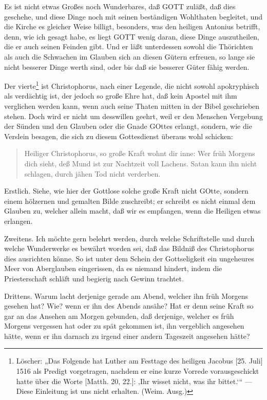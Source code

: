 Es ist nicht etwas Großes noch Wunderbares, daß GOTT zuläßt, daß dies geschehe, und diese Dinge noch mit seinen beständigen Wohlthaten begleitet, und die Kirche es gleicher Weise billigt, besonders, was den heiligen Antonius betrifft, denn, wie ich gesagt habe, es liegt GOTT wenig daran, diese Dinge auszutheilen, die er auch seinen Feinden gibt. Und er läßt unterdessen sowohl die Thörichten als auch die Schwachen im Glauben sich an diesen Gütern erfreuen, so lange sie nicht besserer Dinge werth sind, oder bis daß sie besserer Güter fähig werden.

Der vierte\footnote{Löscher: „Das Folgende hat Luther am Festtage des heiligen Jacobus [25. Juli] 1516 als Predigt vorgetragen, nachdem er eine kurze Vorrede vorausgeschickt hatte über die Worte [Matth. 20, 22.]: ‚Ihr wisset nicht, was ihr bittet.‘“ — Diese Einleitung ist uns nicht erhalten. (Weim. Ausg.)} ist Christophorus, nach einer
Legende, die nicht sowohl apokryphisch als verdächtig ist, der jedoch so große Ehre hat, daß kein Apostel mit ihm verglichen werden kann, wenn auch seine Thaten mitten in der Bibel geschrieben stehen. Doch wird er nicht um desswillen geehrt, weil er den Menschen Vergebung der Sünden und den Glauben oder die Gnade GOttes erlangt, sondern, wie die Verslein besagen, die sich zu diesem Gottesdienst überaus wohl schicken:

\begin{quote}
Heiliger Christophorus, so große Kraft wohnt dir inne: Wer früh Morgens dich sieht, deß Mund ist zur Nachtzeit voll Lachens. Satan kann ihn nicht schlagen, durch jähen Tod nicht verderben.
\end{quote}

Erstlich. Siehe, wie hier der Gottlose solche große Kraft nicht GOtte, sondern einem hölzernen und gemalten Bilde zuschreibt; er schreibt es nicht einmal dem Glauben zu, welcher allein macht, daß wir es empfangen, wenn die Heiligen etwas erlangen.

Zweitens. Ich möchte gern belehrt werden, durch welche Schriftstelle und durch welche Wunderwerke es bewährt worden sei, daß das Bildniß des Christophorus dies ausrichten könne. So ist unter dem Schein der Gottseligkeit ein ungeheures Meer von Aberglauben eingerissen, da es niemand hindert, indem die Priesterschaft schläft und begierig nach Gewinn trachtet.

Drittens. Warum lacht derjenige gerade am Abend, welcher ihn früh Morgens gesehen hat? Wie? wenn er ihn des Abends ansähe? Hat er denn seine Kraft so gar an das Ansehen am Morgen gebunden, daß derjenige, welcher es früh Morgens vergessen hat oder zu spät gekommen ist, ihn vergeblich angesehen hätte, wenn er ihn darnach zu irgend einer andern Tageszeit angesehen hätte?

